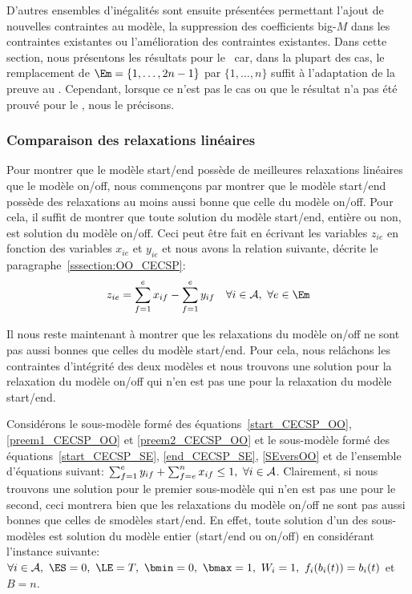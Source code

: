D'autres ensembles d'inégalités sont ensuite présentées permettant
l'ajout de nouvelles contraintes au modèle, la suppression des
coefficients big-$M$ dans les contraintes existantes ou l'amélioration
des contraintes existantes. Dans cette section, nous présentons les
résultats pour le \CECSP~car, dans la plupart des cas, le remplacement
de $\Em=\{1,\dots,2n-1\}$ par $\{1,\dots,n\}$ suffit à l'adaptation
de la preuve au \RCPSP. Cependant, lorsque ce n'est pas le cas ou que
le résultat n'a pas été prouvé pour le \RCPSP, nous le précisons. 

\subsubsection{Comparaison des relaxations linéaires}

Pour montrer que le modèle start/end possède de meilleures relaxations
linéaires que le modèle on/off, nous commençons par montrer que le
modèle start/end possède des relaxations au moins aussi bonne que
celle du modèle on/off. Pour cela, il suffit de  montrer que toute solution du 
modèle start/end, entière ou non, est solution du modèle on/off. Ceci
peut être fait en écrivant les variables $z_{ie}$ en fonction des
variables $x_{ie}$ et $y_{ie}$ et nous avons la relation suivante,
décrite le paragraphe~\ref{sssection:OO_CECSP}: 
\begin{equation}
\label{SEversOO}
z_{ie} = \sum_{f=1}^e x_{if} -  \sum_{f=1}^e y_{if} \quad \forall i
\in \A,\ \forall e\in \Em
\end{equation}

Il nous reste maintenant à montrer que les relaxations du modèle
on/off ne sont pas aussi bonnes que celles du modèle start/end. Pour
cela, nous relâchons les contraintes d'intégrité des deux modèles et
nous trouvons une solution pour la relaxation du modèle on/off qui
n'en est pas une pour la relaxation du modèle start/end. 

Considérons le sous-modèle formé des
équations~\eqref{start_CECSP_OO}, \eqref{preem1_CECSP_OO} et
\eqref{preem2_CECSP_OO} et le sous-modèle formé des
équations~\eqref{start_CECSP_SE}, \eqref{end_CECSP_SE},
\eqref{SEversOO} et de l'ensemble d'équations suivant: $\sum_{f=1}^e
y_{if} +\sum_{f=e}^n x_{if}\le 1,\ \forall i \in {\cal A}$. Clairement, si
nous trouvons une solution pour le premier sous-modèle qui n'en est
pas une pour le second, ceci montrera bien que les relaxations du modèle
on/off ne sont pas aussi bonnes que celles de smodèles start/end. En
effet, toute solution d'un des sous-modèles est solution du modèle
entier (start/end ou on/off) en considérant l'instance suivante:
$\forall i \in \A,\ \ES=0,\ \LE=T,\ \bmin=0,\ \bmax=1,\ W_i=1,\
f_i(b_i(t))=b_i(t)$ et $B=n$. 

